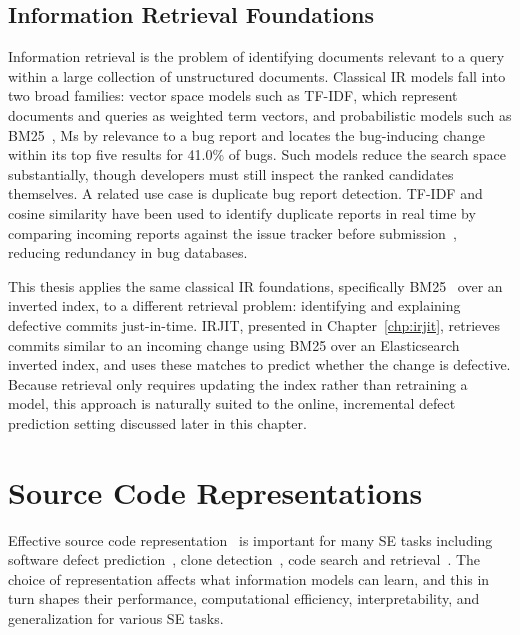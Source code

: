 \documentclass[\main/thesis.tex]{subfiles}
\begin{document}
\subsection{Information Retrieval Foundations}
\label{sec:ir-foundations}
Information retrieval is the problem of identifying documents relevant to a query within a large collection of unstructured documents. Classical IR models fall into two broad families: vector space models such as TF-IDF, which represent documents and queries as weighted term vectors, and probabilistic models such as BM25~\cite{BM25}, Ms by relevance to a bug report and locates the bug-inducing change within its top five results for 41.0\% of bugs.  Such models reduce the search space substantially, though developers must still inspect the ranked candidates themselves. A related use case is duplicate bug report detection. TF-IDF and cosine similarity have been used to identify duplicate reports in real time by comparing incoming reports against the issue tracker before submission~\cite{hindle2019query}, reducing redundancy in bug databases.

This thesis applies the same classical IR foundations, specifically BM25~\cite{BM25} over an inverted index, to a different retrieval problem: identifying and explaining defective commits just-in-time. IRJIT, presented in Chapter~\ref{chp:irjit}, retrieves commits similar to an incoming change using BM25 over an Elasticsearch inverted index, and uses these matches to predict whether the change is defective. Because retrieval only requires updating the index rather than retraining a model, this approach is naturally suited to the online, incremental defect prediction setting discussed later in this chapter.




\section{Source Code Representations}
\label{sec:representations}
Effective source code representation~\cite{namavar2022controlled} is important for many SE tasks including software defect prediction~\cite{li2018progress}, clone detection~\cite{corazza2010tree}, code search and retrieval~\cite{facoy}. The choice of representation affects what information models can learn, and this in turn shapes their performance, computational efficiency, interpretability, and generalization for various SE tasks.

\end{document}
